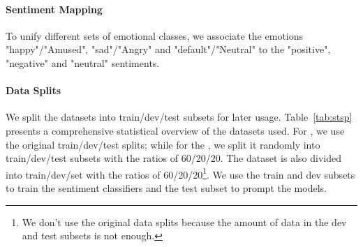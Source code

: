 \paragraph{Sentiment Mapping} To unify different sets of emotional classes, we associate the emotions "happy"/"Amused", "sad"/"Angry" and "default"/"Neutral" to the "positive", "negative" and "neutral" sentiments.

\paragraph{Data Splits} We split the datasets into train/dev/test subsets for later usage. Table~\ref{tab:stsp} presents a comprehensive statistical overview of the datasets used. For \expressoread, we use the original train/dev/test splits; while for the \emov, we split it randomly into train/dev/test subsets with the ratios of 60/20/20. The \expressoasr dataset is also divided into train/dev/set with the ratios of 60/20/20\footnote{We don't use the original data splits because the amount of data in the dev and test subsets is not enough.}. We use the train and dev subsets to train the sentiment classifiers and the test subset to prompt the \spot models.

\iffalse
\subsection{Fine-Tuning \spot on Expressive Dataset}
To further fine-tune \spot with the expressive data, we download the audiobooks\footnote{\url{https://github.com/facebookresearch/libri-light/blob/main/data\_preparation/download\_librivox.py}}from the category \textit{Dramatic Readings} of LibriVox\footnote{\url{https://librivox.org/}}. Then we follow the same pipeline in \cite{kang2023libriheavy} to locate, segment and align the audios. It results in an aligned Speech-Text dataset with 1K hours of audio, 97M tokens in speech and 13M tokens in text. Finally, we utilize the pretrained checkpoint from Interleaving Rope+SProp-V2 in 75K steps, continue fine-tuning on this dataset till 100K steps with a sampling probability of 2.6\% along with all the datasets listed in Table~\ref{tab:data}. We refer to this fine-tuned model as Interleaving Rope+SProp-V2 FT.
\fi

